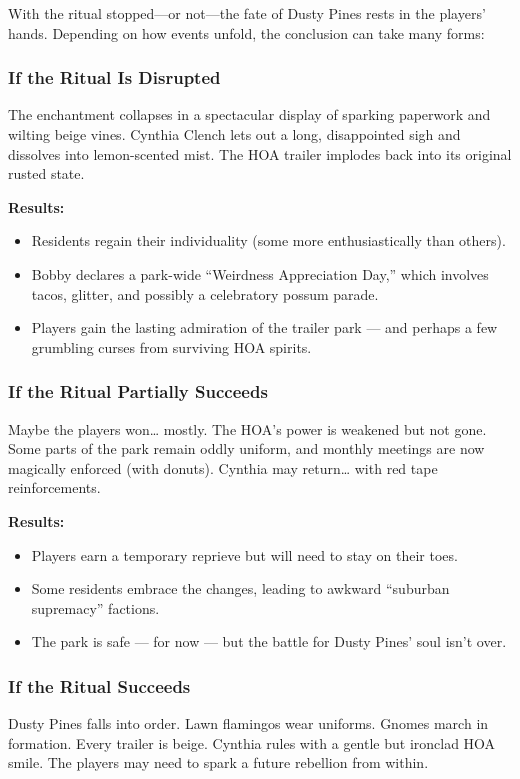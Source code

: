 \begin{multicols}{2}
With the ritual stopped—or not—the fate of Dusty Pines rests in the players’ hands. Depending on how events unfold, the conclusion can take many forms:

\subsubsection*{If the Ritual Is Disrupted}
The enchantment collapses in a spectacular display of sparking paperwork and wilting beige vines. Cynthia Clench lets out a long, disappointed sigh and dissolves into lemon-scented mist. The HOA trailer implodes back into its original rusted state.

\textbf{Results:}
\begin{itemize}
    \item Residents regain their individuality (some more enthusiastically than others).
    \item Bobby declares a park-wide “Weirdness Appreciation Day,” which involves tacos, glitter, and possibly a celebratory possum parade.
    \item Players gain the lasting admiration of the trailer park — and perhaps a few grumbling curses from surviving HOA spirits.
\end{itemize}

\subsubsection*{If the Ritual Partially Succeeds}
Maybe the players won… mostly. The HOA’s power is weakened but not gone. Some parts of the park remain oddly uniform, and monthly meetings are now magically enforced (with donuts). Cynthia may return… with red tape reinforcements.

\textbf{Results:}
\begin{itemize}
    \item Players earn a temporary reprieve but will need to stay on their toes.
    \item Some residents embrace the changes, leading to awkward “suburban supremacy” factions.
    \item The park is safe — for now — but the battle for Dusty Pines’ soul isn’t over.
\end{itemize}

\subsubsection*{If the Ritual Succeeds}
Dusty Pines falls into order. Lawn flamingos wear uniforms. Gnomes march in formation. Every trailer is beige. Cynthia rules with a gentle but ironclad HOA smile. The players may need to spark a future rebellion from within.


\end{multicols}

